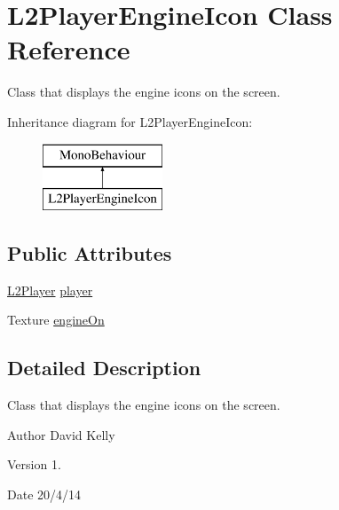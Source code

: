 \hypertarget{class_l2_player_engine_icon}{\section{L2\-Player\-Engine\-Icon Class Reference}
\label{class_l2_player_engine_icon}
}


Class that displays the engine icons on the screen.  


Inheritance diagram for L2\-Player\-Engine\-Icon\-:\begin{figure}[H]
\begin{center}
\leavevmode
\includegraphics[height=2.000000cm]{class_l2_player_engine_icon}
\end{center}
\end{figure}
\subsection*{Public Attributes}
\begin{DoxyCompactItemize}
\item 
\hyperlink{class_l2_player}{L2\-Player} \hyperlink{class_l2_player_engine_icon_aade810346a1d59d61fe8775670926534}{player}
\item 
Texture \hyperlink{class_l2_player_engine_icon_a634b2ec6b0dfb77eca75328c43986b77}{engine\-On}
\end{DoxyCompactItemize}


\subsection{Detailed Description}
Class that displays the engine icons on the screen. 

\begin{DoxyAuthor}{Author}
David Kelly 
\end{DoxyAuthor}
\begin{DoxyVersion}{Version}
1. 
\end{DoxyVersion}
\begin{DoxyDate}{Date}
20/4/14 
\end{DoxyDate}


